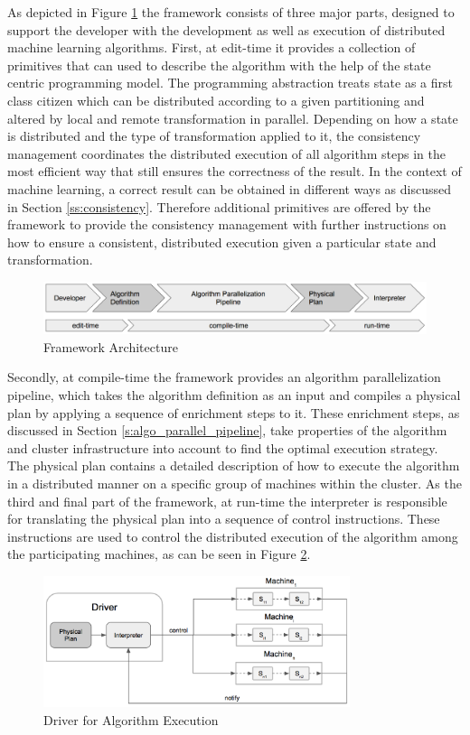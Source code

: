 As depicted in Figure \ref{fig:framework_architecture} the framework consists of three major parts, designed to support the developer with the development as well as execution of distributed machine learning algorithms.
First, at edit-time it provides a collection of primitives that can used to describe the algorithm with the help of the state centric programming model.
The programming abstraction treats state as a first class citizen which can be distributed according to a given partitioning and altered by local and remote transformation in parallel.
Depending on how a state is distributed and the type of transformation applied to it, the consistency management coordinates the distributed execution of all algorithm steps in the most efficient way that still ensures the correctness of the result.
In the context of machine learning, a correct result can be obtained in different ways as discussed in Section \ref{ss:consistency}.
Therefore additional primitives are offered by the framework to provide the consistency management with further instructions on how to ensure a consistent, distributed execution given a particular state and transformation.
\begin{figure}[ht]
\centering
\includegraphics[width=1.0\textwidth]{img/framework_architecture.png}
\caption{Framework Architecture}
\label{fig:framework_architecture}
\end{figure}
Secondly, at compile-time the framework provides an algorithm parallelization pipeline, which takes the algorithm definition as an input and compiles a physical plan by applying a sequence of enrichment steps to it.
These enrichment steps, as discussed in Section \ref{s:algo_parallel_pipeline}, take properties of the algorithm and cluster infrastructure into account to find the optimal execution strategy.
The physical plan contains a detailed description of how to execute the algorithm in a distributed manner on a specific group of machines within the cluster.
As the third and final part of the framework, at run-time the interpreter is responsible for translating the physical plan into a sequence of control instructions.
These instructions are used to control the distributed execution of the algorithm among the participating machines, as can be seen in Figure \ref{fig:framework_driver}.
\begin{figure}[ht]
\centering
\includegraphics[width=0.8\textwidth]{img/framework_driver.png}
\caption{Driver for Algorithm Execution}
\label{fig:framework_driver}
\end{figure}
